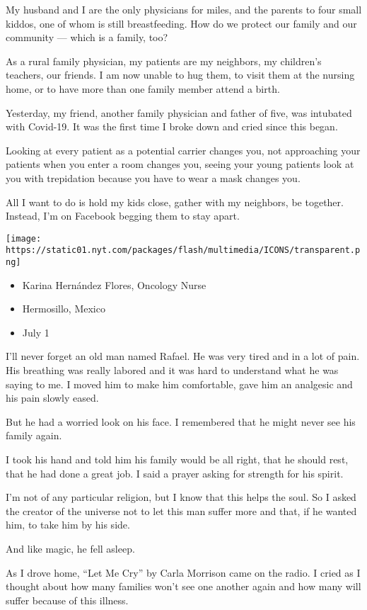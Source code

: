 My husband and I are the only physicians for miles, and the parents to
four small kiddos, one of whom is still breastfeeding. How do we protect
our family and our community --- which is a family, too?

As a rural family physician, my patients are my neighbors, my children's
teachers, our friends. I am now unable to hug them, to visit them at the
nursing home, or to have more than one family member attend a birth.

Yesterday, my friend, another family physician and father of five, was
intubated with Covid-19. It was the first time I broke down and cried
since this began.

Looking at every patient as a potential carrier changes you, not
approaching your patients when you enter a room changes you, seeing your
young patients look at you with trepidation because you have to wear a
mask changes you.

All I want to do is hold my kids close, gather with my neighbors, be
together. Instead, I'm on Facebook begging them to stay apart.

\texttt{[image: https://static01.nyt.com/packages/flash/multimedia/ICONS/transparent.png]}

\begin{itemize}
\tightlist
\item
  Karina Hernández Flores, Oncology Nurse
\item
  Hermosillo, Mexico
\item
  July 1
\end{itemize}

I'll never forget an old man named Rafael. He was very tired and in a
lot of pain. His breathing was really labored and it was hard to
understand what he was saying to me. I moved him to make him
comfortable, gave him an analgesic and his pain slowly eased.

But he had a worried look on his face. I remembered that he might never
see his family again.

I took his hand and told him his family would be all right, that he
should rest, that he had done a great job. I said a prayer asking for
strength for his spirit.

I'm not of any particular religion, but I know that this helps the soul.
So I asked the creator of the universe not to let this man suffer more
and that, if he wanted him, to take him by his side.

And like magic, he fell asleep.

As I drove home, ``Let Me Cry'' by Carla Morrison came on the radio. I
cried as I thought about how many families won't see one another again
and how many will suffer because of this illness.

